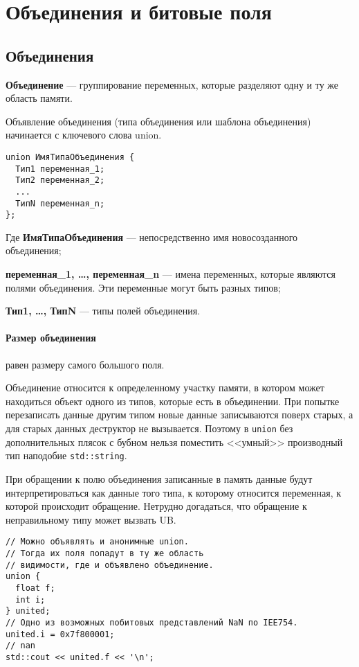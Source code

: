 \section{Объединения и битовые поля}
\subsection{Объединения}
\textbf{Объединение} --- группирование переменных, которые разделяют одну и ту же область памяти.

Объявление объединения (типа объединения или шаблона объединения) начинается с ключевого слова union.
\begin{verbatim}
union ИмяТипаОбъединения {
  Тип1 переменная_1;
  Тип2 переменная_2;
  ...
  ТипN переменная_n;
};
\end{verbatim}

Где
\textbf{ИмяТипаОбъединения} --- непосредственно имя новосозданного объединения;

\textbf{переменная\_1, \dots, переменная\_n} --- имена переменных, которые являются полями объединения.
Эти переменные могут быть разных типов;

\textbf{Тип1, \dots, ТипN} --- типы полей объединения.

\paragraph{Размер объединения} равен размеру самого большого поля.

Объединение относится к определенному участку памяти, в котором может находиться объект одного из типов,
которые есть в объединении. При попытке перезаписать данные другим типом новые данные записываются
поверх старых, а для старых данных деструктор не вызывается. Поэтому в \verb|union| без
дополнительных плясок с бубном нельзя поместить <<умный>> производный тип наподобие \verb|std::string|.

При обращении к полю объединения записанные в память данные будут
интерпретироваться как данные того типа, к которому относится переменная, к которой происходит
обращение. Нетрудно догадаться, что обращение к неправильному типу может вызвать UB.
\begin{verbatim}
// Можно объявлять и анонимные union.
// Тогда их поля попадут в ту же область
// видимости, где и объявлено объединение.
union {
  float f;
  int i;
} united;
// Одно из возможных побитовых представлений NaN по IEE754.
united.i = 0x7f800001;
// nan
std::cout << united.f << '\n';
\end{verbatim}

